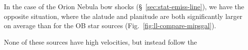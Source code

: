 
In the case of the Orion Nebula bow shocks
(\S~\ref{sec:stat-emiss-line}), we have the opposite situation, where
the alatude and planitude are both significantly larger on average
than for the OB star sources (Fig.~\ref{fig:ll-compare-mipsgal}).  

None of these sources have high velocities, but instead follow the   

